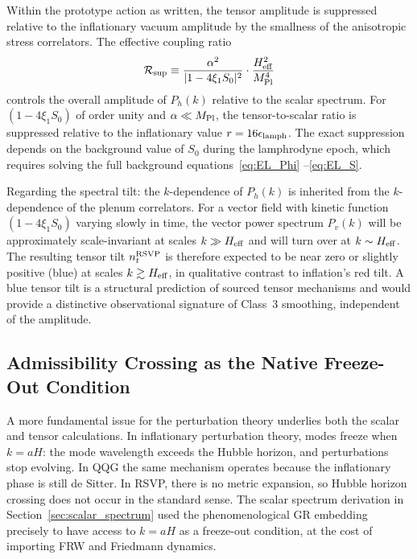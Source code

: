 \documentclass[12pt, a4paper]{article}
\newcommand{\epslamph}{\epsilon_{\rm lamph}}
\newcommand{\Heff}{H_{\rm eff}}
\newcommand{\Ph}{P_h}
\begin{document}
Within the prototype action as written, the tensor amplitude is suppressed relative
to the inflationary vacuum amplitude by the smallness of the anisotropic stress
correlators. The effective coupling ratio
\begin{equation}
\mathcal{R}_{\rm sup} \equiv \frac{\alpha^2}{|1 - 4\xi_1 S_0|^2} \cdot
\frac{\Heff^2}{M_{\rm Pl}^4}
\label{eq:suppression}
\end{equation}
controls the overall amplitude of $\Ph(k)$ relative to the scalar spectrum. For
$(1 - 4\xi_1 S_0)$ of order unity and $\alpha \ll M_{\rm Pl}$, the tensor-to-scalar
ratio is suppressed relative to the inflationary value $r = 16\epslamph$. The
exact suppression depends on the background value of $S_0$ during the lamphrodyne
epoch, which requires solving the full background equations~\eqref{eq:EL_Phi}
--\eqref{eq:EL_S}.

Regarding the spectral tilt: the $k$-dependence of $\Ph(k)$ is inherited from
the $k$-dependence of the plenum correlators. For a vector field with kinetic
function $(1 - 4\xi_1 S_0)$ varying slowly in time, the vector power spectrum
$P_v(k)$ will be approximately scale-invariant at scales $k \gg \Heff$ and will
turn over at $k \sim \Heff$. The resulting tensor tilt $n_t^{\rm RSVP}$ is
therefore expected to be near zero or slightly positive (blue) at scales
$k \gtrsim \Heff$, in qualitative contrast to inflation's red tilt. A blue tensor
tilt is a structural prediction of sourced tensor mechanisms and would provide
a distinctive observational signature of Class~3 smoothing, independent of the
amplitude.

\subsection{Admissibility Crossing as the Native Freeze-Out Condition}

A more fundamental issue for the perturbation theory underlies both the scalar and
tensor calculations. In inflationary perturbation theory, modes freeze when $k =
aH$: the mode wavelength exceeds the Hubble horizon, and perturbations stop
evolving. In QQG the same mechanism operates because the inflationary phase is
still de Sitter. In RSVP, there is no metric expansion, so Hubble horizon crossing
does not occur in the standard sense. The scalar spectrum derivation in
Section~\ref{sec:scalar_spectrum} used the phenomenological GR embedding precisely
to have access to $k = aH$ as a freeze-out condition, at the cost of importing FRW
and Friedmann dynamics.
\end{document}
